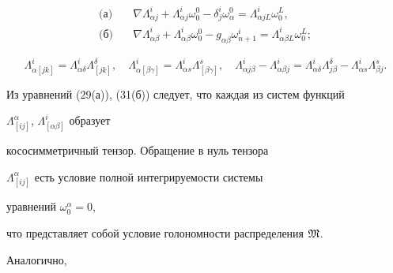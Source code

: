 \begin{equation} 


\begin{split} 


\text{(а)}\quad & \nabla \Lambda^i_{\alpha j}+\Lambda^i_{\alpha j} 


\omega^0_0-\delta^i_j\omega^0_\alpha= 


\Lambda^i_{\alpha j L}\omega^L_0,\\ 


% 


\text{(б)}\quad & \nabla \Lambda^i_{\alpha\beta}+ 


\Lambda^i_{\alpha\beta} 


\omega^0_0-g_{\alpha\beta}\omega^i_{n+1}= 


\Lambda^i_{\alpha\beta L}\omega^L_0; 


\end{split} 


\end{equation} 


\begin{equation} 


\Lambda^i_{\alpha[j k]}=\Lambda^i_{\alpha\delta} 


\Lambda^\delta_{[j k]},\quad 


% 


\Lambda^i_{\alpha[\beta\gamma]}=\Lambda^i_{\alpha s} 


\Lambda^s_{[\beta\gamma]},\quad 


% 


\Lambda^i_{\alpha j\beta}-\Lambda^i_{\alpha\beta j}= 


\Lambda^i_{\alpha\delta}\Lambda^\delta_{j\beta}- 


\Lambda^i_{\alpha s}\Lambda^s_{\beta j}. 


\end{equation} 


Из уравнений (29(а)), (31(б)) следует, что каждая из систем функций 


$\Lambda^\alpha_{[ij]}$, $\Lambda^i_{[\alpha\beta]}$ образует 


кососимметричный тензор. Обращение в нуль тензора 


$\Lambda^\alpha_{[ij]}$ есть условие полной интегрируемости системы 


уравнений $\omega^\alpha_0=0$,


что представляет собой условие голономности распределения $\frak M$. 


Аналогично, 


